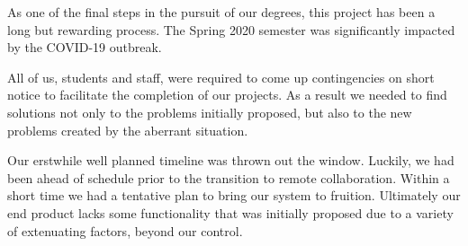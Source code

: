 As one of the final steps in the pursuit of our degrees, this project has been a long but rewarding process. The Spring 2020 semester was significantly impacted by the COVID-19 outbreak. 
\par All of us, students and staff, were required to come up contingencies on short notice to facilitate the completion of our projects. As a result we needed to find solutions not only to the problems initially proposed, but also to the new problems created by the aberrant situation. 
\par Our erstwhile well planned timeline was thrown out the window. Luckily, we had been ahead of schedule prior to the transition to remote collaboration. Within a short time we had a tentative plan to bring our system to fruition. Ultimately our end product lacks some functionality that was initially proposed due to a variety of extenuating factors, beyond our control. 